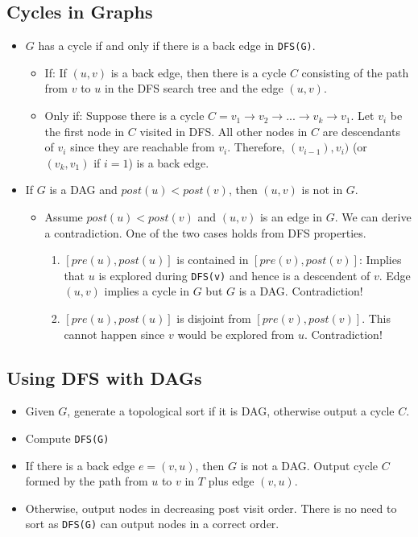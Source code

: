 \subsection{Cycles in Graphs}
\begin{itemize}
    \item $G$ has a cycle if and only if there is a back edge in \texttt{DFS(G)}.
    \begin{itemize}
        \item If: If $(u, v)$ is a back edge, then there is a cycle $C$ consisting of the path from $v$ to $u$ in the DFS search tree and the edge $(u, v)$.
        \item Only if: Suppose there is a cycle $C = v_1 \rightarrow v_2 \rightarrow ... \rightarrow v_k \rightarrow v_1$. Let $v_i$ be the first node in $C$ visited in DFS. All other nodes in $C$ are descendants of $v_i$ since they are reachable from $v_i$. Therefore, $(v_{i - 1}), v_i)$ (or $(v_k, v_1)$ if $i = 1$) is a back edge.
    \end{itemize}
    \item If $G$ is a DAG and $post(u) < post(v)$, then $(u, v)$ is not in $G$.
    \begin{itemize}
        \item Assume $post(u) < post(v)$ and $(u, v)$ is an edge in $G$. We can derive a contradiction. One of the two cases holds from DFS properties.
        \begin{enumerate}
            \item $[pre(u), post(u)]$ is contained in $[pre(v), post(v)]$: Implies that $u$ is explored during \texttt{DFS(v)} and hence is a descendent of $v$. Edge $(u, v)$ implies a cycle in $G$ but $G$ is a DAG. Contradiction!
            \item $[pre(u), post(u)]$ is disjoint from $[pre(v), post(v)]$. This cannot happen since $v$ would be explored from $u$. Contradiction!
        \end{enumerate}
    \end{itemize}
\end{itemize}

\subsection{Using DFS with DAGs}
\begin{itemize}
    \item Given $G$, generate a topological sort if it is DAG, otherwise output a cycle $C$.
    \item Compute \texttt{DFS(G)}
    \item If there is a back edge $e = (v, u)$, then $G$ is not a DAG. Output cycle $C$ formed by the path from $u$ to $v$ in $T$ plus edge $(v, u)$.
    \item Otherwise, output nodes in decreasing post visit order. There is no need to sort as \texttt{DFS(G)} can output nodes in a correct order.
\end{itemize}


